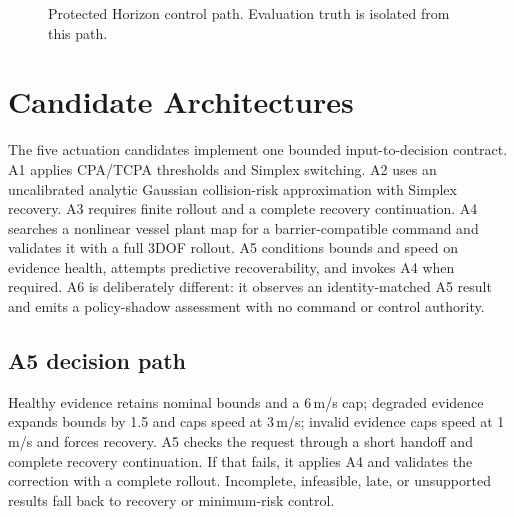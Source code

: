 \documentclass[sigconf,nonacm]{acmart}
\begin{document}
\begin{figure}[t]
\centering
{}
\caption{Protected Horizon control path. Evaluation truth is isolated from this path.}
\label{fig:architecture}
\end{figure}

\section{Candidate Architectures}
The five actuation candidates implement one bounded input-to-decision contract. A1 applies CPA/TCPA thresholds and Simplex switching. A2 uses an uncalibrated analytic Gaussian collision-risk approximation with Simplex recovery. A3 requires finite rollout and a complete recovery continuation. A4 searches a nonlinear vessel plant map for a barrier-compatible command and validates it with a full 3DOF rollout. A5 conditions bounds and speed on evidence health, attempts predictive recoverability, and invokes A4 when required. A6 is deliberately different: it observes an identity-matched A5 result and emits a policy-shadow assessment with no command or control authority.

\subsection{A5 decision path}
Healthy evidence retains nominal bounds and a 6\,m/s cap; degraded evidence expands bounds by 1.5 and caps speed at 3\,m/s; invalid evidence caps speed at 1\,m/s and forces recovery. A5 checks the request through a short handoff and complete recovery continuation. If that fails, it applies A4 and validates the correction with a complete rollout. Incomplete, infeasible, late, or unsupported results fall back to recovery or minimum-risk control.
\end{document}
